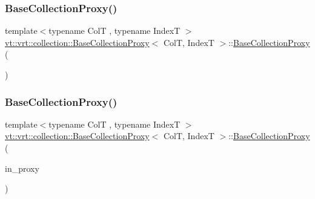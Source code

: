 \subsubsection{\texorpdfstring{Base\+Collection\+Proxy()}{BaseCollectionProxy()}\hspace{0.1cm}{\footnotesize\ttfamily [3/4]}}
{\footnotesize\ttfamily template$<$typename ColT , typename IndexT $>$ \\
\hyperlink{structvt_1_1vrt_1_1collection_1_1_base_collection_proxy}{vt\+::vrt\+::collection\+::\+Base\+Collection\+Proxy}$<$ ColT, IndexT $>$\+::\hyperlink{structvt_1_1vrt_1_1collection_1_1_base_collection_proxy}{Base\+Collection\+Proxy} (\begin{DoxyParamCaption}\item[{\hyperlink{structvt_1_1vrt_1_1collection_1_1_base_collection_proxy}{Base\+Collection\+Proxy}$<$ ColT, IndexT $>$ \&\&}]{ }\end{DoxyParamCaption})\hspace{0.3cm}{\ttfamily [default]}}

\mbox{\label{structvt_1_1vrt_1_1collection_1_1_base_collection_proxy_a4fa854b643ae6f475adaa3e1e382f1d3}} 
\subsubsection{\texorpdfstring{Base\+Collection\+Proxy()}{BaseCollectionProxy()}\hspace{0.1cm}{\footnotesize\ttfamily [4/4]}}
{\footnotesize\ttfamily template$<$typename ColT , typename IndexT $>$ \\
\hyperlink{structvt_1_1vrt_1_1collection_1_1_base_collection_proxy}{vt\+::vrt\+::collection\+::\+Base\+Collection\+Proxy}$<$ ColT, IndexT $>$\+::\hyperlink{structvt_1_1vrt_1_1collection_1_1_base_collection_proxy}{Base\+Collection\+Proxy} (\begin{DoxyParamCaption}\item[{\hyperlink{namespacevt_a1b417dd5d684f045bb58a0ede70045ac}{Virtual\+Proxy\+Type} const}]{in\+\_\+proxy }\end{DoxyParamCaption})\hspace{0.3cm}{\ttfamily [explicit]}}



